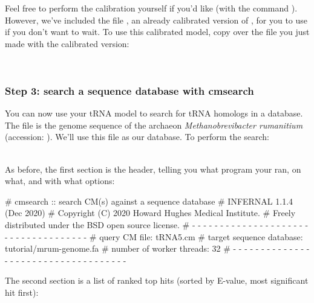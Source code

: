 Feel free to perform the calibration yourself if you'd like (with the
command ). However, we've included the file
, an already calibrated version of ,
for you to use if you don't want to wait. To use this calibrated
model, copy over the  file you just made with the
calibrated version:
 
\\
 
\subsubsection{Step 3: search a sequence database with cmsearch}

You can now use your tRNA model to search for tRNA homologs in a
database. The file  is the genome sequence of the
archaeon \emph{Methanobrevibacter rumanitium} (accession:
). We'll use this file as our database. To perform
the search:

\\

As before, the first section is the header, telling you what program
your ran, on what, and with what options:

\begin{sreoutput}
# cmsearch :: search CM(s) against a sequence database
# INFERNAL 1.1.4 (Dec 2020)
# Copyright (C) 2020 Howard Hughes Medical Institute.
# Freely distributed under the BSD open source license.
# - - - - - - - - - - - - - - - - - - - - - - - - - - - - - - - - - - - -
# query CM file:                         tRNA5.cm
# target sequence database:              tutorial/mrum-genome.fa
# number of worker threads:              32
# - - - - - - - - - - - - - - - - - - - - - - - - - - - - - - - - - - - -
\end{sreoutput}

The second section is a list of ranked top hits (sorted by E-value,
most significant hit first):

